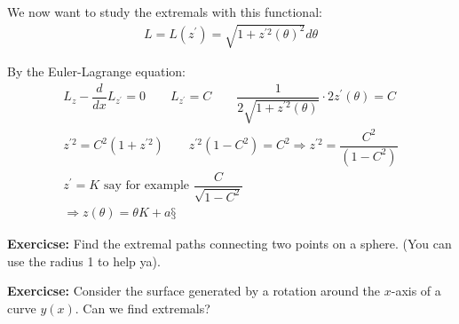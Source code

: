 \par\bigskip
\noindent We now want to study the extremals with this functional:
\begin{equation*}
  \begin{gathered}
    L = L(z^{\prime}) = \sqrt{1+z^{\prime2}(\theta)^2}d\theta
  \end{gathered}
\end{equation*}\par
\noindent By the Euler-Lagrange equation:
\begin{equation*}
  \begin{gathered}
    L_z-\dfrac{d}{dx}L_{z^{\prime}} = 0\qquad L_{z^{\prime}} = C\qquad\dfrac{1}{2\sqrt{1+z^{\prime2}(\theta)}}\cdot2z^{\prime}(\theta) = C\\
    z^{\prime2} = C^2(1+z^{\prime2})\qquad z^{\prime2}(1-C^2) = C^2\Rightarrow z^{\prime2} = \dfrac{C^2}{(1-C^2)}\\
    z^{\prime} = K\text{ say for example } \dfrac{C}{\sqrt{1-C^2}}\\
    \Rightarrow z(\theta) = \theta K+a§
  \end{gathered}
\end{equation*}
\par\bigskip
\noindent\textbf{Exercicse:} Find the extremal paths connecting two points on a sphere. (You can use the radius 1 to help ya).
\par\bigskip
\noindent\textbf{Exercicse:} Consider the surface generated by a rotation around the $x$-axis of a curve $y(x)$. Can we find extremals?
